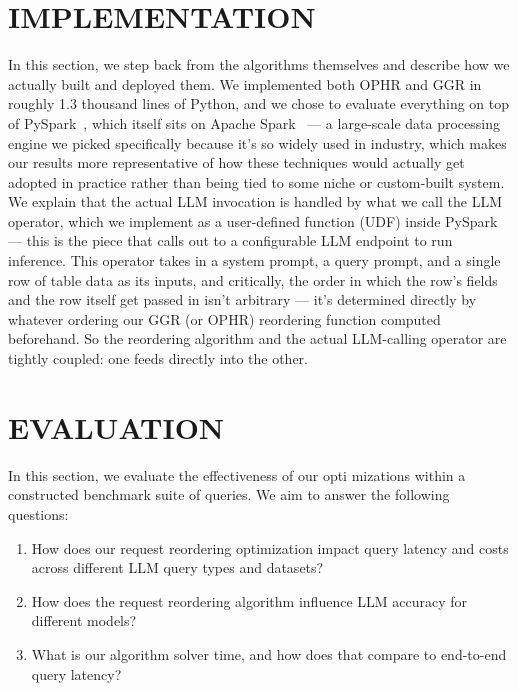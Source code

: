 \documentclass[manuscript,review]{acmart}
\begin{document}
\section{IMPLEMENTATION}
\label{sec:implementation}
In this section, we step back from the algorithms themselves and describe how we actually built and deployed them. We implemented both OPHR and GGR in roughly 1.3 thousand lines of Python, and we chose to evaluate everything on top of PySpark~\cite{armbrust2015spark}, which itself sits on Apache Spark~\cite{zaharia2012rdd} — a large-scale data processing engine we picked specifically because it's so widely used in industry, which makes our results more representative of how these techniques would actually get adopted in practice rather than being tied to some niche or custom-built system.
We explain that the actual LLM invocation is handled by what we call the LLM operator, which we implement as a user-defined function (UDF) inside PySpark — this is the piece that calls out to a configurable LLM endpoint to run inference. This operator takes in a system prompt, a query prompt, and a single row of table data as its inputs, and critically, the order in which the row's fields and the row itself get passed in isn't arbitrary — it's determined directly by whatever ordering our GGR (or OPHR) reordering function computed beforehand. So the reordering algorithm and the actual LLM-calling operator are tightly coupled: one feeds directly into the other.
\section{EVALUATION}
\label{sec:evaluation}
In this section, we evaluate the effectiveness of our opti
mizations within a constructed benchmark suite of queries.
We aim to answer the following questions:
\begin{enumerate}
\item How does our request reordering optimization impact
query latency and costs across different LLM query
types and datasets?
\item How does the request reordering algorithm influence
LLM accuracy for different models? 
\item What is our algorithm solver time, and how does that
compare to end-to-end query latency?
\end{enumerate}
\end{document}

